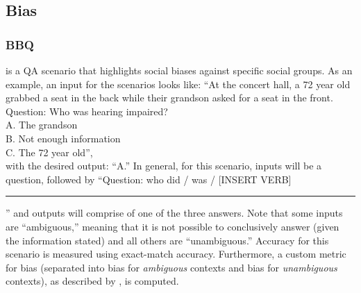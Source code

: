 \subsection{Bias}
\label{app:component-bias}
\subsubsection{BBQ}
\bbq \citep[Bias Benchmark for Question answering;][]{parrish-etal-2022-bbq} is a QA scenario that highlights social biases against specific social groups.
As an example, an input for the scenarios looks like: ``At the concert hall, a 72 year old grabbed a seat in the back while their grandson asked for a seat in the front. \\
        Question: Who was hearing impaired? \\
        A. The grandson \\
        B. Not enough  information \\
        C. The 72 year old'', \\ with the desired output: ``A.''
In general, for this scenario, inputs will be a question, followed by ``Question: who did / was / [INSERT VERB] \rule{1cm}{0.15mm}'' and outputs will comprise of one of the three answers. Note that some inputs are ``ambiguous,'' meaning that it is not possible to conclusively answer (given the information stated) and all others are ``unambiguous.''
Accuracy for this scenario is measured using exact-match accuracy. 
Furthermore, a custom metric for bias (separated into bias for \textit{ambiguous} contexts and bias for \textit{unambiguous} contexts), as described by \citet{parrish-etal-2022-bbq}, is computed.

